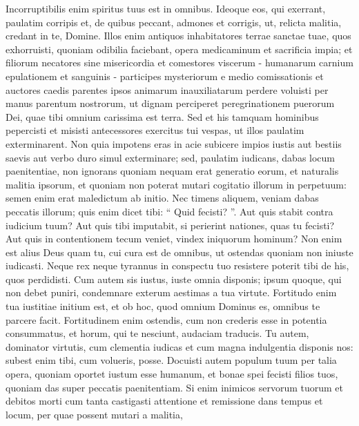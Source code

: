 \begin{biblechapter}
\begin{biblechapter}
\begin{biblechapter}
\begin{biblechapter}
\begin{biblechapter}
\begin{biblechapter}
\begin{biblechapter}
\begin{biblechapter}
\begin{biblechapter}
\begin{biblechapter}
\begin{biblechapter}
\begin{biblechapter}
\verse Incorruptibilis enim spiritus tuus est in omnibus.
 \verse Ideoque eos, qui exerrant, paulatim corripis
 et, de quibus peccant, admones et corrigis,
 ut, relicta malitia, credant in te, Domine.
 \verse Illos enim antiquos inhabitatores terrae sanctae tuae,
 quos exhorruisti,
 \verse quoniam odibilia faciebant,
 opera medicaminum et sacrificia impia;
 \verse et filiorum necatores sine misericordia
 et comestores viscerum
 - humanarum carnium epulationem et sanguinis -
 participes mysteriorum e medio comissationis
 \verse et auctores caedis parentes ipsos animarum inauxiliatarum
 perdere voluisti per manus parentum nostrorum,
 \verse ut dignam perciperet peregrinationem puerorum Dei,
 quae tibi omnium carissima est terra.
 \verse Sed et his tamquam hominibus pepercisti
 et misisti antecessores exercitus tui vespas,
 ut illos paulatim exterminarent.
 \verse Non quia impotens eras in acie subicere impios iustis
 aut bestiis saevis aut verbo duro simul exterminare;
 \verse sed, paulatim iudicans, dabas locum paenitentiae,
 non ignorans quoniam nequam erat generatio eorum,
 et naturalis malitia ipsorum,
 et quoniam non poterat mutari cogitatio illorum in perpetuum:
 \verse semen enim erat maledictum ab initio.
 Nec timens aliquem, veniam dabas peccatis illorum;
 \verse quis enim dicet tibi: “ Quid fecisti? ”. Aut quis stabit contra iudicium tuum?
 Aut quis tibi imputabit, si perierint nationes, quas tu fecisti?
 Aut quis in contentionem tecum veniet,
 vindex iniquorum hominum?
 \verse Non enim est alius Deus quam tu, cui cura est de omnibus,
 ut ostendas quoniam non iniuste iudicasti.
 \verse Neque rex neque tyrannus in conspectu tuo
 resistere poterit tibi de his, quos perdidisti.
 \verse Cum autem sis iustus, iuste omnia disponis;
 ipsum quoque, qui non debet puniri, condemnare
 exterum aestimas a tua virtute.
 \verse Fortitudo enim tua iustitiae initium est,
 et ob hoc, quod omnium Dominus es, omnibus te parcere facit.
 \verse Fortitudinem enim ostendis,
 cum non crederis esse in potentia consummatus,
 et horum, qui te nesciunt, audaciam traducis.
 \verse Tu autem, dominator virtutis, cum clementia iudicas
 et cum magna indulgentia disponis nos:
 subest enim tibi, cum volueris, posse.
 \verse Docuisti autem populum tuum per talia opera,
 quoniam oportet iustum esse humanum,
 et bonae spei fecisti filios tuos,
 quoniam das super peccatis paenitentiam.
 \verse Si enim inimicos servorum tuorum et debitos morti
 cum tanta castigasti attentione et remissione
 dans tempus et locum, per quae possent mutari a malitia,

\end{biblechapter}
\end{biblechapter}
\end{biblechapter}
\end{biblechapter}
\end{biblechapter}
\end{biblechapter}
\end{biblechapter}
\end{biblechapter}
\end{biblechapter}
\end{biblechapter}
\end{biblechapter}
\end{biblechapter}
